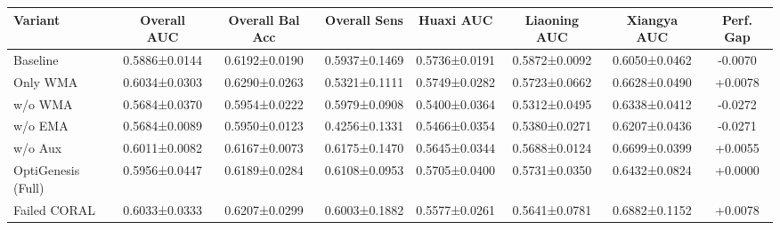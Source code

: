 \begin{tabular}{lccccccc}
\hline
Variant & Overall AUC & Overall Bal Acc & Overall Sens & Huaxi AUC & Liaoning AUC & Xiangya AUC & Perf. Gap \\
\hline
Baseline & 0.5886±0.0144 & 0.6192±0.0190 & 0.5937±0.1469 & 0.5736±0.0191 & 0.5872±0.0092 & 0.6050±0.0462 & -0.0070 \\
Only WMA & 0.6034±0.0303 & 0.6290±0.0263 & 0.5321±0.1111 & 0.5749±0.0282 & 0.5723±0.0662 & 0.6628±0.0490 & +0.0078 \\
w/o WMA & 0.5684±0.0370 & 0.5954±0.0222 & 0.5979±0.0908 & 0.5400±0.0364 & 0.5312±0.0495 & 0.6338±0.0412 & -0.0272 \\
w/o EMA & 0.5684±0.0089 & 0.5950±0.0123 & 0.4256±0.1331 & 0.5466±0.0354 & 0.5380±0.0271 & 0.6207±0.0436 & -0.0271 \\
w/o Aux & 0.6011±0.0082 & 0.6167±0.0073 & 0.6175±0.1470 & 0.5645±0.0344 & 0.5688±0.0124 & 0.6699±0.0399 & +0.0055 \\
OptiGenesis (Full) & 0.5956±0.0447 & 0.6189±0.0284 & 0.6108±0.0953 & 0.5705±0.0400 & 0.5731±0.0350 & 0.6432±0.0824 & +0.0000 \\
Failed CORAL & 0.6033±0.0333 & 0.6207±0.0299 & 0.6003±0.1882 & 0.5577±0.0261 & 0.5641±0.0781 & 0.6882±0.1152 & +0.0078 \\
\hline
\end{tabular}
